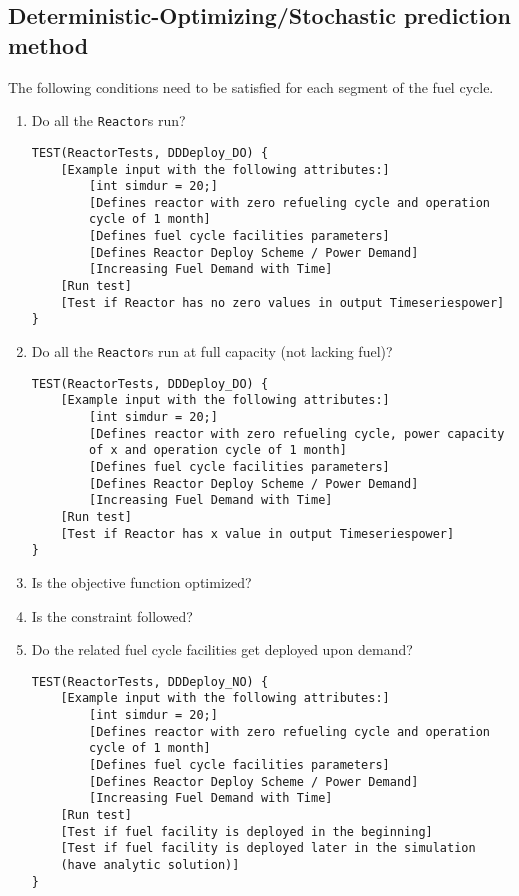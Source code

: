 \documentclass[12pt,letterpaper]{article}
\begin{document}
\subsection{Deterministic-Optimizing/Stochastic prediction method}
The following conditions need to be satisfied for each segment of the fuel cycle. 

\begin{enumerate}
\item Do all the \texttt{Reactor}s run? 
\begin{verbatim}
TEST(ReactorTests, DDDeploy_DO) {
    [Example input with the following attributes:]
        [int simdur = 20;]
        [Defines reactor with zero refueling cycle and operation 
        cycle of 1 month]
        [Defines fuel cycle facilities parameters]
        [Defines Reactor Deploy Scheme / Power Demand]
        [Increasing Fuel Demand with Time]
    [Run test]
    [Test if Reactor has no zero values in output Timeseriespower]
}
\end{verbatim}
\item  Do all the \texttt{Reactor}s run at full capacity (not lacking fuel)? 
\begin{verbatim}
TEST(ReactorTests, DDDeploy_DO) {
    [Example input with the following attributes:]
        [int simdur = 20;]
        [Defines reactor with zero refueling cycle, power capacity 
        of x and operation cycle of 1 month]
        [Defines fuel cycle facilities parameters]
        [Defines Reactor Deploy Scheme / Power Demand]
        [Increasing Fuel Demand with Time]
    [Run test]
    [Test if Reactor has x value in output Timeseriespower]
}
\end{verbatim}

\item Is the objective function optimized?

\item Is the constraint followed? 

\item  Do the related fuel cycle facilities get deployed upon demand?
\begin{verbatim}
TEST(ReactorTests, DDDeploy_NO) {
    [Example input with the following attributes:]
        [int simdur = 20;]
        [Defines reactor with zero refueling cycle and operation 
        cycle of 1 month]
        [Defines fuel cycle facilities parameters]
        [Defines Reactor Deploy Scheme / Power Demand]
        [Increasing Fuel Demand with Time]
    [Run test]
    [Test if fuel facility is deployed in the beginning]
    [Test if fuel facility is deployed later in the simulation 
    (have analytic solution)]
}
\end{verbatim}


\end{enumerate}
\end{document}
